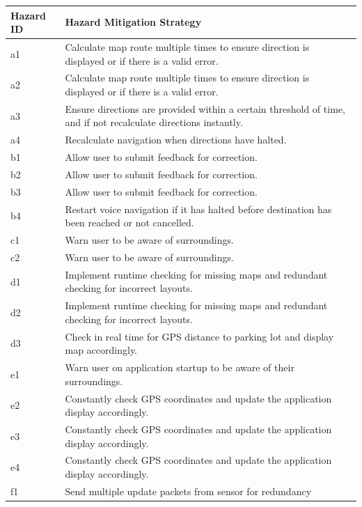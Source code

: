 \documentclass[]{article}
\begin{document}
\begin{table}
	\begin{tabular}{ | m{2.5cm} | m{12cm} |} 
		\hline
		Hazard ID & 
		Hazard Mitigation Strategy
		\\ [0.5ex]
		\hline 
		a1 & Calculate map route multiple times to ensure direction is displayed or if there is a valid error. \\	
		\hline 
		a2 & Calculate map route multiple times to ensure direction is displayed or if there is a valid error. \\	
		\hline 
		a3 & Ensure directions are provided within a certain threshold of time, and if not recalculate directions instantly. \\	
		\hline 
		a4 & Recalculate navigation when directions have halted. \\	
		\hline 
		b1 & Allow user to submit feedback for correction. \\	
		\hline 
		b2 & Allow user to submit feedback for correction. \\	
		\hline 
		b3 & Allow user to submit feedback for correction. \\	
		\hline 
		b4 & Restart voice navigation if it has halted before destination has been reached or not cancelled. \\	
		\hline 
		c1 & Warn user to be aware of surroundings. \\	
		\hline 
		c2 & Warn user to be aware of surroundings. \\	
		\hline 
		d1 & Implement runtime checking for missing maps and redundant checking for incorrect layouts. \\	
		\hline 
		d2 & Implement runtime checking for missing maps and redundant checking for incorrect layouts. \\	
		\hline 
		d3 & Check in real time for GPS distance to parking lot and display map accordingly.  \\
		\hline 
		e1 & Warn user on application startup to be aware of their surroundings.  \\
		\hline 
		e2 & Constantly check GPS coordinates and update the application display accordingly.  \\
		\hline 
		e3 & Constantly check GPS coordinates and update the application display accordingly.  \\
		\hline 
		e4 & Constantly check GPS coordinates and update the application display accordingly. \\
		\hline 
		f1 & Send multiple update packets from sensor for redundancy  \\

\end{tabular}
\end{table}
\end{document}
